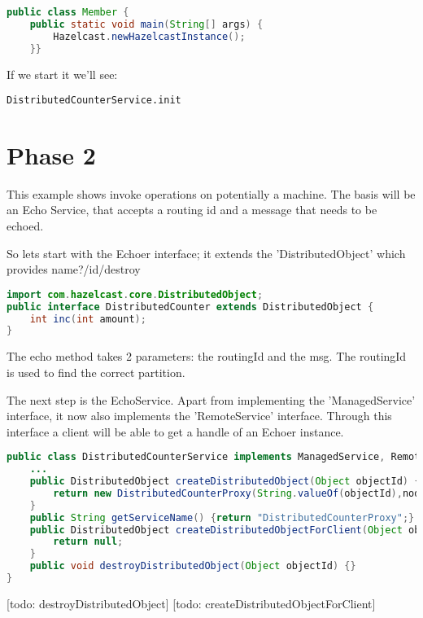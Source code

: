 \begin{lstlisting}[language=java]
public class Member {
    public static void main(String[] args) {
        Hazelcast.newHazelcastInstance();
    }}
\end{lstlisting}
If we start it we'll see:
\begin{lstlisting}
DistributedCounterService.init
\end{lstlisting}

\section{Phase 2}
This example shows invoke operations on potentially a machine. The basis will be an Echo Service, that accepts a routing id and a message that needs to be echoed.

So lets start with the Echoer interface; it extends the 'DistributedObject' which provides name?/id/destroy
\begin{lstlisting}[language=java]
import com.hazelcast.core.DistributedObject;
public interface DistributedCounter extends DistributedObject {
    int inc(int amount);
}
\end{lstlisting}
The echo method takes 2 parameters: the routingId and the msg. The routingId is used to find the correct partition. 

The next step is the EchoService. Apart from implementing the 'ManagedService' interface, it now also implements the 'RemoteService' interface. Through this interface a client will be able to get a handle of an Echoer instance.
\begin{lstlisting}[language=java]
public class DistributedCounterService implements ManagedService, RemoteService {
    ...  
    public DistributedObject createDistributedObject(Object objectId) {
        return new DistributedCounterProxy(String.valueOf(objectId),nodeEngine);
    }
    public String getServiceName() {return "DistributedCounterProxy";}
    public DistributedObject createDistributedObjectForClient(Object objectId) {
        return null;
    }
    public void destroyDistributedObject(Object objectId) {}
}
\end{lstlisting}
[todo: destroyDistributedObject]
[todo: createDistributedObjectForClient]

